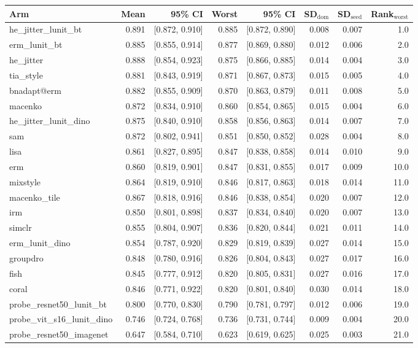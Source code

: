 \begin{tabular}{lrrrrrrr}
\toprule
Arm & Mean & 95\% CI & Worst & 95\% CI & SD$_\text{dom}$ & SD$_\text{seed}$ & Rank$_\text{worst}$ \\
\midrule
he\_jitter\_lunit\_bt & 0.891 & [0.872, 0.910] & 0.885 & [0.872, 0.890] & 0.008 & 0.007 & 1.0 \\
erm\_lunit\_bt & 0.885 & [0.855, 0.914] & 0.877 & [0.869, 0.880] & 0.012 & 0.006 & 2.0 \\
he\_jitter & 0.888 & [0.854, 0.923] & 0.875 & [0.866, 0.885] & 0.014 & 0.004 & 3.0 \\
tia\_style & 0.881 & [0.843, 0.919] & 0.871 & [0.867, 0.873] & 0.015 & 0.005 & 4.0 \\
bnadapt@erm & 0.882 & [0.855, 0.909] & 0.870 & [0.863, 0.879] & 0.011 & 0.008 & 5.0 \\
macenko & 0.872 & [0.834, 0.910] & 0.860 & [0.854, 0.865] & 0.015 & 0.004 & 6.0 \\
he\_jitter\_lunit\_dino & 0.875 & [0.840, 0.910] & 0.858 & [0.856, 0.863] & 0.014 & 0.007 & 7.0 \\
sam & 0.872 & [0.802, 0.941] & 0.851 & [0.850, 0.852] & 0.028 & 0.004 & 8.0 \\
lisa & 0.861 & [0.827, 0.895] & 0.847 & [0.838, 0.858] & 0.014 & 0.010 & 9.0 \\
erm & 0.860 & [0.819, 0.901] & 0.847 & [0.831, 0.855] & 0.017 & 0.009 & 10.0 \\
mixstyle & 0.864 & [0.819, 0.910] & 0.846 & [0.817, 0.863] & 0.018 & 0.014 & 11.0 \\
macenko\_tile & 0.867 & [0.818, 0.916] & 0.846 & [0.838, 0.854] & 0.020 & 0.007 & 12.0 \\
irm & 0.850 & [0.801, 0.898] & 0.837 & [0.834, 0.840] & 0.020 & 0.007 & 13.0 \\
simclr & 0.855 & [0.804, 0.907] & 0.836 & [0.820, 0.844] & 0.021 & 0.011 & 14.0 \\
erm\_lunit\_dino & 0.854 & [0.787, 0.920] & 0.829 & [0.819, 0.839] & 0.027 & 0.014 & 15.0 \\
groupdro & 0.848 & [0.780, 0.916] & 0.826 & [0.804, 0.843] & 0.027 & 0.017 & 16.0 \\
fish & 0.845 & [0.777, 0.912] & 0.820 & [0.805, 0.831] & 0.027 & 0.016 & 17.0 \\
coral & 0.846 & [0.771, 0.922] & 0.820 & [0.801, 0.840] & 0.030 & 0.014 & 18.0 \\
probe\_resnet50\_lunit\_bt & 0.800 & [0.770, 0.830] & 0.790 & [0.781, 0.797] & 0.012 & 0.006 & 19.0 \\
probe\_vit\_s16\_lunit\_dino & 0.746 & [0.724, 0.768] & 0.736 & [0.731, 0.744] & 0.009 & 0.004 & 20.0 \\
probe\_resnet50\_imagenet & 0.647 & [0.584, 0.710] & 0.623 & [0.619, 0.625] & 0.025 & 0.003 & 21.0 \\
\bottomrule
\end{tabular}
